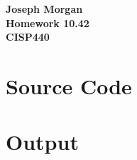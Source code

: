 \documentclass[12pt,titlepage]{article}
\begin{document}
\begin{titlepage}
	\centering
	\vfill
	{\bfseries\Large
		Joseph Morgan\\
		\large
		Homework 10.42\\
		\vskip2cm
		CISP440\\
	}
	\vfill
	\vfill
	\vfill
\end{titlepage}
\section{Source Code} 



\section{Output}

\end{document}
